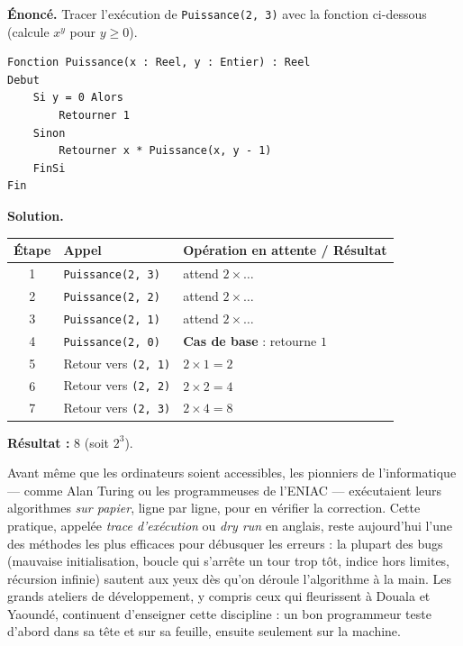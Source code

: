 \documentclass[11pt]{article}
\begin{document}
\begin{exoresolu}
\textbf{Énoncé.} Tracer l'exécution de \texttt{Puissance(2, 3)} avec la fonction ci-dessous (calcule $x^y$ pour $y \ge 0$).

\begin{lstlisting}
Fonction Puissance(x : Reel, y : Entier) : Reel
Debut
    Si y = 0 Alors
        Retourner 1
    Sinon
        Retourner x * Puissance(x, y - 1)
    FinSi
Fin
\end{lstlisting}

\tcblower
\textbf{Solution.}

\begin{center}
\begin{tabularx}{\linewidth}{|c|l|X|}
\hline
\rowcolor{popblueL} Étape & Appel & Opération en attente / Résultat \\
\hline
1 & \texttt{Puissance(2, 3)} & attend $2 \times \dots$ \\
\hline
2 & \texttt{Puissance(2, 2)} & attend $2 \times \dots$ \\
\hline
3 & \texttt{Puissance(2, 1)} & attend $2 \times \dots$ \\
\hline
4 & \texttt{Puissance(2, 0)} & \textbf{Cas de base} : retourne $1$ \\
\hline
5 & Retour vers \texttt{(2, 1)} & $2 \times 1 = 2$ \\
\hline
6 & Retour vers \texttt{(2, 2)} & $2 \times 2 = 4$ \\
\hline
7 & Retour vers \texttt{(2, 3)} & $2 \times 4 = 8$ \\
\hline
\end{tabularx}
\end{center}
\textbf{Résultat :} $8$ (soit $2^3$).
\end{exoresolu}

\begin{savaistu}
Avant même que les ordinateurs soient accessibles, les pionniers de l'informatique — comme Alan Turing ou les programmeuses de l'ENIAC — exécutaient leurs algorithmes \emph{sur papier}, ligne par ligne, pour en vérifier la correction. Cette pratique, appelée \emph{trace d'exécution} ou \emph{dry run} en anglais, reste aujourd'hui l'une des méthodes les plus efficaces pour débusquer les erreurs : la plupart des bugs (mauvaise initialisation, boucle qui s'arrête un tour trop tôt, indice hors limites, récursion infinie) sautent aux yeux dès qu'on déroule l'algorithme à la main. Les grands ateliers de développement, y compris ceux qui fleurissent à Douala et Yaoundé, continuent d'enseigner cette discipline : un bon programmeur teste d'abord dans sa tête et sur sa feuille, ensuite seulement sur la machine.
\end{savaistu}
\end{document}

